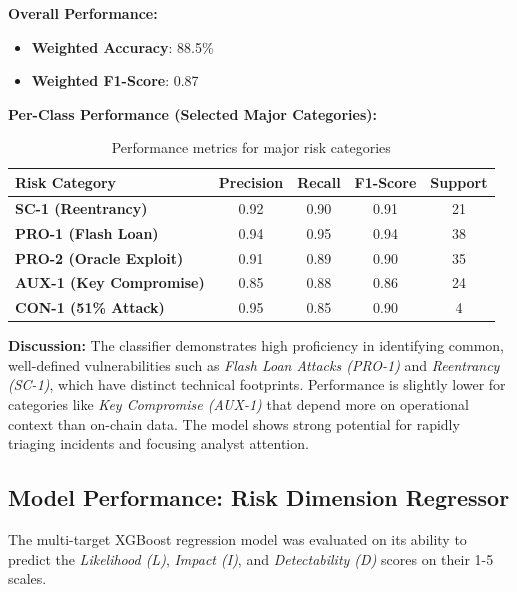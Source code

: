\documentclass[a4paper]{article}
\begin{document}
\begin{multicols}{2}
\textbf{Overall Performance:}
\begin{itemize}
    \item \textbf{Weighted Accuracy}: 88.5\%
    \item \textbf{Weighted F1-Score}: 0.87
\end{itemize}

\textbf{Per-Class Performance (Selected Major Categories):}

\begin{table}[H]
\centering
\begin{tabular}{lcccc}
\toprule
\textbf{Risk Category} & \textbf{Precision} & \textbf{Recall} & \textbf{F1-Score} & \textbf{Support} \\
\midrule
\textbf{SC-1 (Reentrancy)} & 0.92 & 0.90 & 0.91 & 21 \\
\textbf{PRO-1 (Flash Loan)} & 0.94 & 0.95 & 0.94 & 38 \\
\textbf{PRO-2 (Oracle Exploit)} & 0.91 & 0.89 & 0.90 & 35 \\
\textbf{AUX-1 (Key Compromise)} & 0.85 & 0.88 & 0.86 & 24 \\
\textbf{CON-1 (51\% Attack)} & 0.95 & 0.85 & 0.90 & 4 \\
\bottomrule
\end{tabular}
\caption{Performance metrics for major risk categories}
\label{tab:classifier_performance}
\end{table}

\vspace{0.5cm}

\textbf{Discussion:} The classifier demonstrates high proficiency in identifying common, well-defined vulnerabilities such as \textit{Flash Loan Attacks (PRO-1)} and \textit{Reentrancy (SC-1)}, which have distinct technical footprints. Performance is slightly lower for categories like \textit{Key Compromise (AUX-1)} that depend more on operational context than on-chain data. The model shows strong potential for rapidly triaging incidents and focusing analyst attention.

\vspace{0.5cm}

\subsection{Model Performance: Risk Dimension Regressor}

The multi-target XGBoost regression model was evaluated on its ability to predict the \textit{Likelihood (L)}, \textit{Impact (I)}, and \textit{Detectability (D)} scores on their 1-5 scales.


\end{multicols}
\end{document}
